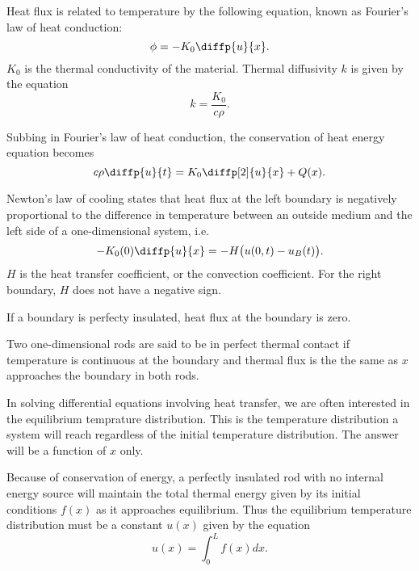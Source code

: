 \documentclass{article}
\begin{document}
\begin{definition}
	Heat flux is related to temperature by the following equation, known as Fourier's law of heat conduction:
	\begin{equation*}
		\phi=-K_0\diffp{u}{x}.
	\end{equation*}
	\(K_0\) is the thermal conductivity of the material. Thermal diffusivity \(k\) is given by the equation
	\begin{equation*}
		k=\frac{K_0}{c\rho}.
	\end{equation*}
\end{definition}
\begin{proposition}
	Subbing in Fourier's law of heat conduction, the conservation of heat energy equation becomes
	\begin{equation*}
		c\rho\diffp{u}{t}=K_0\diffp[2]{u}{x}+Q(x).
	\end{equation*}
\end{proposition}
\begin{definition}
	Newton's law of cooling states that heat flux at the left boundary is negatively proportional to the difference in temperature between an outside medium and the left side of a one-dimensional system, i.e.
	\begin{equation*}
		-K_0(0)\diffp{u}{x}=-H\big(u(0,t)-u_B(t)\big).
	\end{equation*}
	\(H\) is the heat transfer coefficient, or the convection coefficient. For the right boundary, \(H\) does not have a negative sign.
\end{definition}
\begin{proposition}
	If a boundary is perfecty insulated, heat flux at the boundary is zero.
\end{proposition}
\begin{definition}
	Two one-dimensional rods are said to be in perfect thermal contact if temperature is continuous at the boundary and thermal flux is the the same as \(x\) approaches the boundary in both rods.
\end{definition}
\begin{definition}
	In solving differential equations involving heat transfer, we are often interested in the equilibrium temprature distribution. This is the temperature distribution a system will reach regardless of the initial temperature distribution. The answer will be a function of \(x\) only.
\end{definition}
\begin{proposition}
	Because of conservation of energy, a perfectly insulated rod with no internal energy source will maintain the total thermal energy given by its initial conditions \(f(x)\) as it approaches equilibrium. Thus the equilibrium temperature distribution must be a constant \(u(x)\) given by the equation
	\begin{equation*}
		u(x)=\int_0^Lf(x)dx.
	\end{equation*}
\end{proposition}
\end{document}
